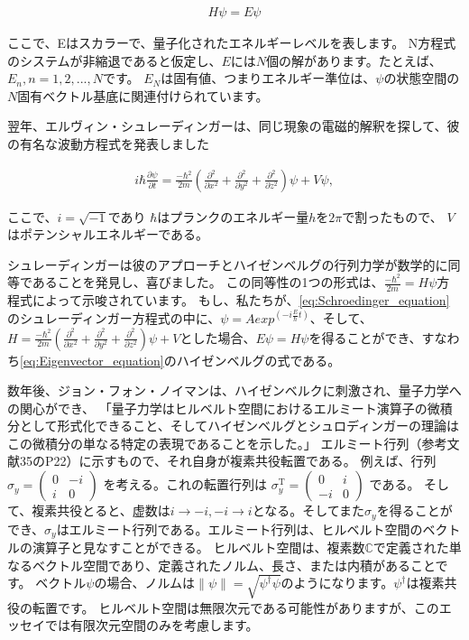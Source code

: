 \begin{align}
H \psi = E \psi \label{eq:Eigenvector_equation}
\end{align}

ここで、Eはスカラーで、量子化されたエネルギーレベルを表します。
N方程式のシステムが非縮退であると仮定し、$E$には$N$個の解があります。たとえば、$E_n, n = 1,2,...,N$です。
$E_N$は固有値、つまりエネルギー準位は、$\psi$の状態空間の$N$固有ベクトル基底に関連付けられています。

翌年、エルヴィン・シュレーディンガーは、同じ現象の電磁的解釈を探して、彼の有名な波動方程式を発表しました

\begin{align}
i \hbar \frac{\partial \psi}{\partial t} 
= \frac{- \hbar^2}{2m}
\left(    
\frac{\partial^2}{\partial x^2} + \frac{\partial^2}{\partial y^2} + \frac{\partial^2}{\partial z^2}   
\right) \psi + V \psi, \label{eq:Schroedinger_equation}
\end{align}

ここで、$ i = \sqrt{-1} $であり $\hbar$はプランクのエネルギー量$h$を$2 \pi$で割ったもので、
$V$はポテンシャルエネルギーである。

シュレーディンガーは彼のアプローチとハイゼンベルグの行列力学が数学的に同等であることを発見し、喜びました。
この同等性の1つの形式は、$\frac{- \hbar^2}{2m} = H \psi$方程式によって示唆されています。
もし、私たちが、\autoref{eq:Schroedinger_equation}のシュレーディンガー方程式の中に、$\psi = A exp^{(-i \frac{E}{\hbar}t)}$、そして、
$ H = \frac{- \hbar^2}{2m}
\left(    
\frac{\partial^2}{\partial x^2} + \frac{\partial^2}{\partial y^2} + \frac{\partial^2}{\partial z^2}   
\right) \psi + V $とした場合、$ E \psi = H \psi $を得ることができ、すなわち\autoref{eq:Eigenvector_equation}のハイゼンベルグの式である。

数年後、ジョン・フォン・ノイマンは、ハイゼンベルクに刺激され、量子力学への関心ができ、
「量子力学はヒルベルト空間におけるエルミート演算子の微積分として形式化できること、そしてハイゼンベルグとシュロディンガーの理論はこの微積分の単なる特定の表現であることを示した。」 
エルミート行列（参考文献35のP22）に示すもので、それ自身が複素共役転置である。
例えば、行列 $ \sigma_y = \left(  
\begin{array}{ccc}
 0 & -i \\
 i & 0 
\end{array}
\right) $ を考える。これの転置行列は
 $ \sigma_y^{\mathrm{T}} = \left(  
\begin{array}{ccc}
 0 & i \\
 -i & 0 
\end{array}
\right) $ 
である。
そして、複素共役とると、虚数は$i \rightarrow -i, -i \rightarrow i $となる。そしてまた$\sigma_y$を得ることができ、$\sigma_y$はエルミート行列である。エルミート行列は、ヒルベルト空間のベクトルの演算子と見なすことができる。
ヒルベルト空間は、複素数$\mathbb{C}$で定義された単なるベクトル空間であり、定義されたノルム、長さ、または内積があることです。
ベクトル$\psi$の場合、ノルムは$ \parallel \psi \parallel = \sqrt{\psi^{\dagger} \psi} $のようになります。$\psi^{\dagger}$は複素共役の転置です。
ヒルベルト空間は無限次元である可能性がありますが、このエッセイでは有限次元空間のみを考慮します。

